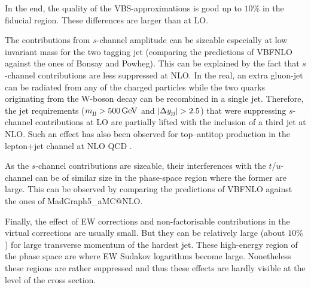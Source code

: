 In the end, the quality of the VBS-approximations is good up to $10\%$ in the fiducial region.
These differences are larger than at LO.

The contributions from $s$-channel amplitude can be sizeable especially at low invariant mass for the two tagging jet (comparing the predictions of {\sc VBFNLO} against the ones of {\sc Bonsay} and {\sc Powheg}).
This can be explained by the fact that $s$-channel contributions are less suppressed at NLO.
In the real, an extra gluon-jet can be radiated from any of the charged particles while the two quarks originating from the W-boson decay can be recombined in a single jet.
Therefore, the jet requirements ($ m_{\text{j} \text{j}} >  500\,\text{GeV}$ and $|\Delta y_{\text{j} \text{j}}| > 2.5$) that were suppressing $s$-channel contributions at LO are partially lifted with the inclusion of a third jet at NLO.
Such an effect has also been observed for top--antitop production in the lepton+jet channel at NLO QCD \cite{Denner:2017kzu}.

As the $s$-channel contributions are sizeable, their interferences with the $t$/$u$-channel can be of similar size in the phase-space region where the former are large.
This can be observed by comparing the predictions of {\sc VBFNLO} against the ones of {\sc MadGraph5\_aMC\-@NLO}.

Finally, the effect of EW corrections and non-factorisable contributions in the virtual corrections are usually small.
But they can be relatively large (about $10\%$) for large transverse momentum of the hardest jet.
These high-energy region of the phase space are where EW Sudakov logarithms become large.
Nonetheless these regions are rather suppressed and thus these effects are hardly visible at the level of the cross section.
